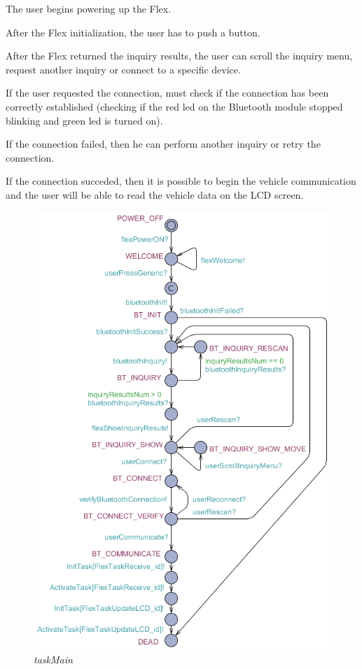 \documentclass[paper=a4, fontsize=11pt]{scrartcl} %
\numberwithin{equation}{section} %
\numberwithin{figure}{section} %
\numberwithin{table}{section} %
\begin{document}
The user begins powering up the Flex.

After the Flex initialization, the user has to push a button.

After the Flex returned the inquiry results, the user can scroll the inquiry menu, request another inquiry or connect to a specific device.

If the user requested the connection, must check if the connection has been correctly established (checking if the red led on the Bluetooth module stopped blinking and green led is turned on).

If the connection failed, then he can perform another inquiry or retry the connection.

If the connection succeded, then it is possible to begin the vehicle communication and the user will be able to read the vehicle data on the LCD screen.

\begin{figure}[H]
  \centering
  \includegraphics[width=5.7in]{img/FLEX-OBD-LCD_taskMain}
  \caption{\textit{taskMain}}
\end{figure}
\end{document}
